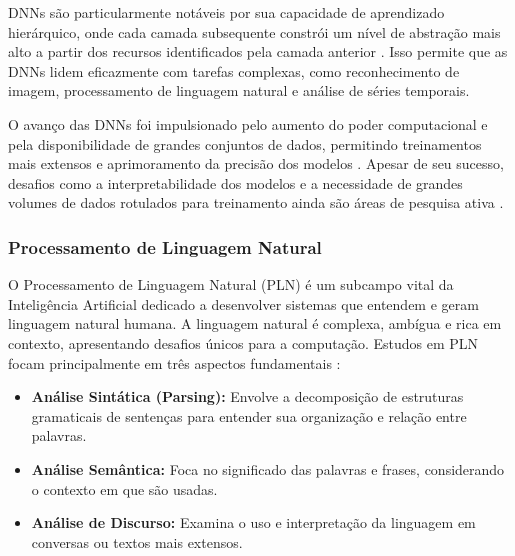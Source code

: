 \documentclass[conference]{IEEEtran}
\begin{document}
DNNs são particularmente notáveis por sua capacidade de aprendizado hierárquico, 
onde cada camada subsequente constrói um nível de abstração mais alto a partir dos recursos 
identificados pela camada anterior \cite{Schmidhuber2015}. 
Isso permite que as DNNs lidem eficazmente com tarefas complexas, como reconhecimento de imagem, 
processamento de linguagem natural e análise de séries temporais.

O avanço das DNNs foi impulsionado pelo aumento do poder computacional e pela disponibilidade de grandes conjuntos de dados, 
permitindo treinamentos mais extensos e aprimoramento da precisão dos modelos \cite{Goodfellow2016}. 
Apesar de seu sucesso, desafios como a interpretabilidade dos modelos e 
a necessidade de grandes volumes de dados rotulados para treinamento 
ainda são áreas de pesquisa ativa \cite{Zhang2018}.



\subsubsection{Processamento de Linguagem Natural}
O Processamento de Linguagem Natural (PLN) é um subcampo vital da Inteligência Artificial dedicado a 
desenvolver sistemas que entendem e geram linguagem natural humana.
A linguagem natural é complexa, ambígua e rica em contexto, apresentando desafios únicos para a computação. 
Estudos em PLN focam principalmente em três aspectos fundamentais \cite{Manning2014}:

\begin{itemize}
\item \textbf{Análise Sintática (Parsing):} Envolve a decomposição de estruturas gramaticais de sentenças para entender sua organização e relação entre palavras.
\item \textbf{Análise Semântica:} Foca no significado das palavras e frases, considerando o contexto em que são usadas.
\item \textbf{Análise de Discurso:} Examina o uso e interpretação da linguagem em conversas ou textos mais extensos.
\end{itemize}
\end{document}
